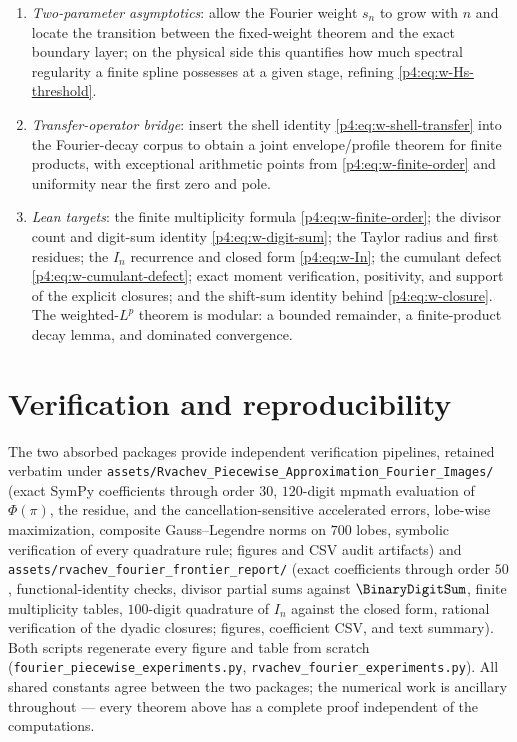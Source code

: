 \documentclass[11pt,oneside]{article}
\numberwithin{equation}{section}
\theoremstyle{definition}
\theoremstyle{remark}
\begin{document}
\begin{enumerate}
      cumulative divisor collapses to the digit sum and the functional
      equation to the cotangent product).
\item \emph{Two-parameter asymptotics}: allow the Fourier weight $s_n$ to
      grow with $n$ and locate the transition between the fixed-weight
      theorem and the exact boundary layer; on the physical side this
      quantifies how much spectral regularity a finite spline possesses at
      a given stage, refining \eqref{p4:eq:w-Hs-threshold}.
\item \emph{Transfer-operator bridge}: insert the shell identity
      \eqref{p4:eq:w-shell-transfer} into the Fourier-decay corpus to obtain
      a joint envelope/profile theorem for finite products, with
      exceptional arithmetic points from \eqref{p4:eq:w-finite-order} and
      uniformity near the first zero and pole.
\item \emph{Lean targets}: the finite multiplicity formula
      \eqref{p4:eq:w-finite-order}; the divisor count and digit-sum identity
      \eqref{p4:eq:w-digit-sum}; the Taylor radius and first residues; the
      $I_n$ recurrence and closed form \eqref{p4:eq:w-In}; the cumulant
      defect \eqref{p4:eq:w-cumulant-defect}; exact moment verification,
      positivity, and support of the explicit closures; and the shift-sum
      identity behind \eqref{p4:eq:w-closure}.  The weighted-$L^p$ theorem is
      modular: a bounded remainder, a finite-product decay lemma, and
      dominated convergence.
\end{enumerate}

\section{Verification and reproducibility}
\label{p4:sec:w-verification}

The two absorbed packages provide independent verification pipelines,
retained verbatim under
\nolinkurl{assets/Rvachev_Piecewise_Approximation_Fourier_Images/} (exact
SymPy coefficients through order $30$, $120$-digit mpmath evaluation of
$\Phi(\pi)$, the residue, and the cancellation-sensitive accelerated
errors, lobe-wise maximization, composite Gauss--Legendre norms on $700$
lobes, symbolic verification of every quadrature rule; figures and CSV
audit artifacts) and
\nolinkurl{assets/rvachev_fourier_frontier_report/} (exact coefficients
through order $50$, functional-identity checks, divisor partial sums
against $\BinaryDigitSum$, finite multiplicity tables, $100$-digit quadrature of
$I_n$ against the closed form, rational verification of the dyadic
closures; figures, coefficient CSV, and text summary).  Both scripts
regenerate every figure and table from scratch
(\texttt{fourier\_piecewise\_experiments.py},
\texttt{rvachev\_fourier\_experiments.py}).  All shared constants agree
between the two packages; the numerical work is ancillary throughout ---
every theorem above has a complete proof independent of the computations.
\end{document}
